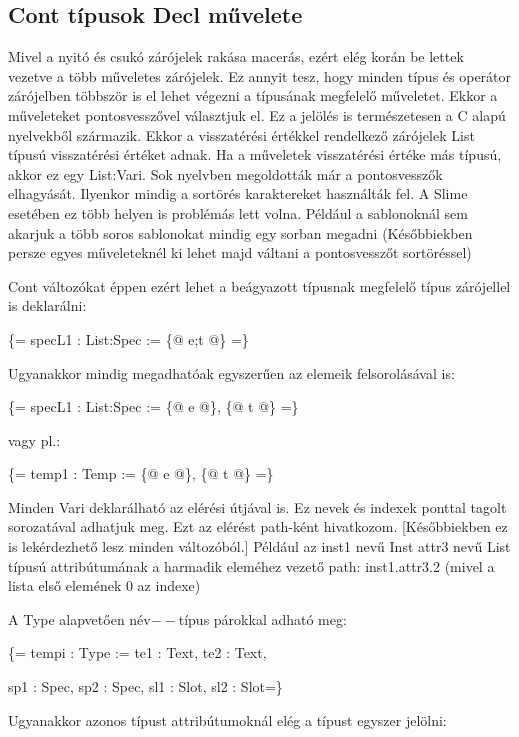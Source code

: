 \subsection{Cont típusok Decl művelete}
\label{sec:SContDecl}
Mivel a nyitó és csukó zárójelek rakása macerás, ezért elég korán be lettek vezetve a több műveletes zárójelek.
Ez annyit tesz, hogy minden típus és operátor zárójelben többször is el lehet végezni a típusának megfelelő műveletet.
Ekkor a műveleteket pontosvesszővel választjuk el.
Ez a jelölés is természetesen a C alapú nyelvekből származik.
Ekkor a visszatérési értékkel rendelkező zárójelek List típusú visszatérési értéket adnak.
Ha a műveletek visszatérési értéke más típusú, akkor ez egy List:Vari. 
Sok nyelvben megoldották már a pontosvesszők elhagyását.
Ilyenkor mindig a sortörés karaktereket használták fel.
A Slime  esetében ez több helyen is problémás lett volna.
Például a sablonoknál sem akarjuk a több soros sablonokat mindig egy sorban megadni
(Későbbiekben persze egyes műveleteknél ki lehet majd váltani a pontosvesszőt sortöréssel)

Cont változókat éppen ezért lehet a beágyazott típusnak megfelelő típus zárójellel is deklarálni:

\{= specL1 : List:Spec := \{@ e;t @\} =\}

Ugyanakkor mindig megadhatóak egyszerűen az elemeik felsorolásával is:

\{= specL1 : List:Spec := \{@ e @\}, \{@ t @\} =\}

vagy pl.:

\{= temp1 : Temp := \{@ e @\}, \{@ t @\} =\}

Minden Vari deklarálható az elérési útjával is.
Ez nevek és indexek ponttal tagolt sorozatával adhatjuk meg.
Ezt az elérést path-ként hivatkozom.
[Későbbiekben ez is lekérdezhető lesz minden változóból.]
Például az inst1 nevű Inst attr3 nevű List típusú attribútumának a harmadik eleméhez vezető path: inst1.attr3.2 
(mivel a lista első elemének 0 az indexe)

A Type alapvetően név$--$típus párokkal adható meg:

\{= tempi : Type := te1 : Text, te2 : Text, 

sp1 : Spec, sp2 : Spec, sl1 : Slot, sl2 : Slot=\}

Ugyanakkor azonos típust attribútumoknál elég a típust egyszer jelölni:

